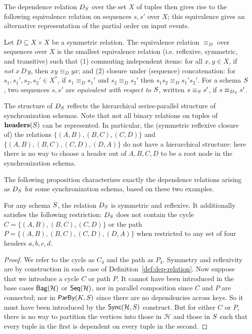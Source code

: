 The dependence relation $D_{\ss}$ over the set $X$ of tuples then gives rise to the following equivalence relation on sequences
$s, s'$ over $X$;
this equivalence gives an alternative representation of the partial order on input events.
\begin{definition}
    Let $D \subseteq X \times X$ be a symmetric relation.
    The equivalence relation $\equiv_D$ over sequences over $X$ is
    the smallest equivalence relation (i.e. reflexive, symmetric, and transitive) such that (1)
    commuting independent items: for all $x, y \in X$, if \emph{not} $x\, D\, y$, then $x y \equiv_D y x$;
    and (2) closure under (sequence) concatenation: for $s_1, s_1', s_2, s_2' \in X^{*}$, if $s_1 \equiv_D s_1'$ and $s_2 \equiv_D s_2'$ then $s_1 s_2 \equiv_D s_1' s_2'$.
    For a schema $\ss$, two sequences $s, s'$ are \emph{equivalent with respect to $\ss$}, written $s \equiv_\ss s'$, if $s \equiv_{D_\ss} s'$.
    \end{definition}
The structure of $D_\ss$ reflects the hierarchical series-parallel structure of synchronization schemas. Note that
not all binary relations on tuples of $\headers(\ss)$ can be represented.
In particular, the (symmetric reflexive closure of)
the relations $\{(A, B), (B, C), (C, D)\}$
and $\{(A, B), (B, C), (C, D), (D, A)\}$
do not have a hierarchical structure:
here there is no way to choose a header out of $A, B, C, D$
to be a root node in the synchronization schema.

The following proposition
characterizes exactly the dependence relations arising as $D_\ss$ for some
synchronization schema, based on these two examples.
\begin{proposition}
For any schema $\ss$, the relation $D_{\ss}$ is symmetric and reflexive.
It additionally satisfies the following restriction:
$D_{\ss}$ does not contain the cycle $C = \{(A, B), (B, C), (C, D)\}$
or the path $P = \{(A, B), (B, C), (C, D), (D, A)\}$ when restricted
to any set of four headers $a, b, c, d$.
\end{proposition}
\begin{proof}
We refer to the cycle as $C_4$ and the path as $P_4$.
Symmetry and reflexivity are by construction in each case of Definition~\ref{def:dep-relation}.
Now suppose that we introduce a cycle $C$ or path $P$.
It cannot have been introduced in the base cases $\relleaf{\mathcal{H}}$
or $\seqleaf{\mathcal{H}}$,
nor in parallel composition since $C$ and $P$ are connected;
nor in $\keyby{K}{S}$ since there are no dependencies across keys.
So it must have been introduced by the $\hier{\mathcal{H}}{\ss}$ construct.
But for either $C$ or $P$, there is no way to partition the vertices into those in
$\mathcal{H}$ and those in $\ss$ such that every tuple in the first is
dependent on every tuple in the second.
\end{proof}

